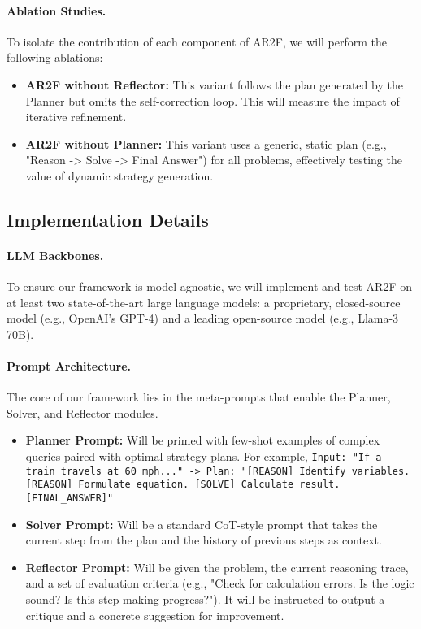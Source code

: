 \documentclass{article}
\begin{document}
\paragraph{Ablation Studies.} To isolate the contribution of each component of AR2F, we will perform the following ablations:
\begin{itemize}
    \item \textbf{AR2F without Reflector:} This variant follows the plan generated by the Planner but omits the self-correction loop. This will measure the impact of iterative refinement.
    \item \textbf{AR2F without Planner:} This variant uses a generic, static plan (e.g., "Reason -> Solve -> Final Answer") for all problems, effectively testing the value of dynamic strategy generation.
\end{itemize}

\subsection{Implementation Details}
\paragraph{LLM Backbones.} To ensure our framework is model-agnostic, we will implement and test AR2F on at least two state-of-the-art large language models: a proprietary, closed-source model (e.g., OpenAI's GPT-4) and a leading open-source model (e.g., Llama-3 70B).

\paragraph{Prompt Architecture.} The core of our framework lies in the meta-prompts that enable the Planner, Solver, and Reflector modules.      
\begin{itemize}
    \item \textbf{Planner Prompt:} Will be primed with few-shot examples of complex queries paired with optimal strategy plans. For example, \texttt{Input: "If a train travels at 60 mph..." -> Plan: "[REASON] Identify variables. [REASON] Formulate equation. [SOLVE] Calculate result. [FINAL\_ANSWER]"}
    \item \textbf{Solver Prompt:} Will be a standard CoT-style prompt that takes the current step from the plan and the history of previous steps as context.
    \item \textbf{Reflector Prompt:} Will be given the problem, the current reasoning trace, and a set of evaluation criteria (e.g., "Check for calculation errors. Is the logic sound? Is this step making progress?"). It will be instructed to output a critique and a concrete suggestion for improvement.
\end{itemize}
\end{document}
